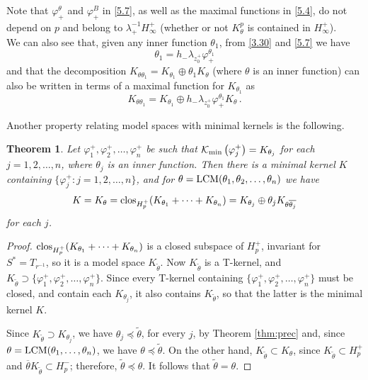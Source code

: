 \documentclass[11pt]{article}
\def\KK{\mathcal{K}}
\def\Kmin#1{\KK_{\rm min}\left( #1 \right) }
\def\LCM{\mathop{\rm LCM}\nolimits}
\def\clos{{\rm clos}}
\def\ol{\overline}
\def\th{\theta}
\renewcommand\phi{\varphi}
\newtheorem{thm}{Theorem}[section]
\numberwithin{equation}{section}
\def\beginpf{\begin{proof}}
\def\endpf{\end{proof}}
\def\beq{\begin{equation}}
\def\eeq{\end{equation}}
\begin{document}
Note that $\phi_+^\theta$ and $\phi_+^B$ in \eqref{5.7}, as well as the maximal functions in \eqref{5.4}, do not depend on $p$ and belong to $\lambda_+^{-1}H_\infty^+$ (whether or not $K_\theta^p$ is contained in $H_\infty^+$).\\

We can also see that, given any inner function $\theta_1$, from \eqref{3.30} and \eqref{5.7} we have
\beq \label{5.8}
\theta_1=h_-\lambda_{z_0^+}\phi_+^{\theta_1}
\eeq
and that the decomposition $K_{\theta\theta_1}=K_{\theta_1} \oplus \theta_1 K_{\theta}$ (where $\theta$ is an inner function) can also be written in terms of a maximal function for $K_{\theta_1}$ as
\beq \label{5.9}
K_{\theta\theta_1}=K_{\theta_1} \oplus h_-\lambda_{z_0^+}\phi_+^{\theta_1} K_{\theta}\, .
\eeq



Another property relating model spaces with minimal kernels is the following.

\begin{thm}\label{thm:40}
Let $\phi_1^+,\phi_2^+,\ldots,\phi_n^+$ be such that $\Kmin{\phi_j^+}=K_{\theta_j}$
for each $j=1,2,\ldots,n$, where $\theta_j$ is an inner function.
Then there is a minimal kernel $K$ containing $\{\phi_j^+: j=1,2,\ldots,n\}$, and for
$\theta=\LCM(\theta_1,\theta_2,\ldots,\theta_n)$ we have
\[
K=K_\theta = \clos_{H^+_p}(K_{\theta_1}+\cdots+K_{\theta_n}) = K_{\theta_j} \oplus \theta_j K_{\theta \overline{\theta_j}}
\]
for each $j$.
\end{thm}

\beginpf

$\clos_{H^+_p}(K_{\theta_1}+\cdots+K_{\theta_n})$ is a closed subspace of $H_p^+$, invariant for $S^*=T_{r^{-1}}$, so it is a model space $K_{\widetilde\th}$.
Now $K_{\widetilde\th}$ is a T-kernel, and $K_{\widetilde\th} \supset \{ \phi_1^+,\phi_2^+,\ldots,\phi_n^+ \}$. Since every T-kernel containing
$\{ \phi_1^+,\phi_2^+,\ldots,\phi_n^+ \}$ must be closed, and contain each $K_{\th_j}$, it also contains $K_{\widetilde\th}$, so that the latter is the minimal kernel $K$.

Since $K_{\widetilde\th} \supset K_{\th_j}$, we have $\theta_j \preceq \widetilde\th$, for every $j$, by Theorem \ref{thm:prec} and, since $\th=\LCM(\th_1,\ldots,\th_n)$, we have $\theta \preceq \widetilde\th$. On the other hand,
$K_{\widetilde\th} \subset K_\th$, since $K_{\widetilde\th} \subset H_p^+$ and $\ol\th K_{\widetilde\th} \subset H_p^-$; therefore,
$\widetilde\th \preceq \th$. It follows that $\widetilde\th=\th$.
\endpf
\end{document}
